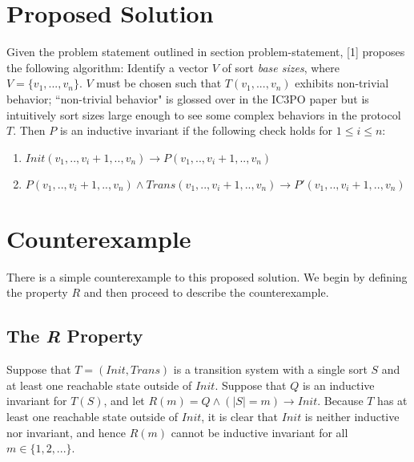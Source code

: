 \documentclass[12pt]{article}
\begin{document}
\section{Proposed Solution}
\label{sol}
Given the problem statement outlined in section problem-statement, [1] proposes the following algorithm: Identify a vector $V$ of sort \textit{base sizes}, where $V = \{v_1,...,v_n\}$.  $V$ must be chosen such that $T(v_1,...,v_n)$ exhibits non-trivial behavior; ``non-trivial behavior" is glossed over in the IC3PO paper but is intuitively sort sizes large enough to see some complex behaviors in the protocol $T$.  Then $P$ is an inductive invariant if the following check holds for $1 \leq i \leq n$:
\begin{enumerate}
  \item $Init(v_1,..,v_i+1,..,v_n) \rightarrow P(v_1,..,v_i+1,..,v_n)$
  \item $P(v_1,..,v_i+1,..,v_n) \land Trans(v_1,..,v_i+1,..,v_n) \rightarrow P'(v_1,..,v_i+1,..,v_n)$
\end{enumerate}

\section{Counterexample}
There is a simple counterexample to this proposed solution.  We begin by defining the property $R$ and then proceed to describe the counterexample.

\subsection{The \textit{R} Property}
Suppose that $T = (Init,Trans)$ is a transition system with a single sort $S$ and at least one reachable state outside of $Init$.  Suppose that $Q$ is an inductive invariant for $T(S)$, and let $R(m) = Q \land (|S|=m) \rightarrow Init$.  Because $T$ has at least one reachable state outside of $Init$, it is clear that $Init$ is neither inductive nor invariant, and hence $R(m)$ cannot be inductive invariant for all $m \in \{1,2,...\}$.  
\end{document}
